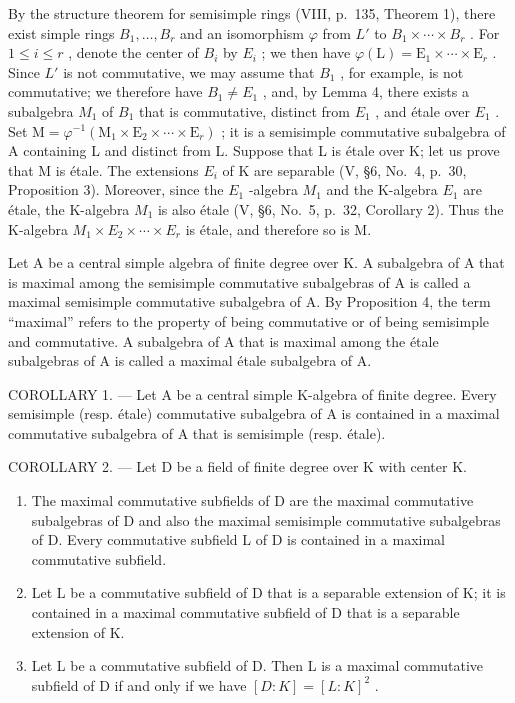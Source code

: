 By the structure theorem for semisimple rings (VIII, p.~135, Theorem 1), there exist simple rings \(B_{1},\ldots,B_{r}\) and an isomorphism \(\varphi\) from \(L'\) to \(B_{1}\times\cdots\times B_{r}\) . For \(1\leqslant i\leqslant r\) , denote the center of \(B_{i}\) by \(E_{i}\) ; we then have \(\varphi(\mathrm{L})=\mathrm{E}_{1}\times\cdots\times\mathrm{E}_{r}\) . Since \(L'\) is not commutative, we may assume that \(B_{1}\) , for example, is not commutative; we therefore have \(B_{1}\neq E_{1}\) , and, by Lemma 4, there exists a subalgebra \(M_{1}\) of \(B_{1}\) that is commutative, distinct from \(E_{1}\) , and étale over \(E_{1}\) . Set \(\mathrm{M} = \varphi^{-1}(\mathrm{M}_{1} \times \mathrm{E}_{2} \times \cdots \times \mathrm{E}_{r})\) ; it is a semisimple commutative subalgebra of A containing L and distinct from L. Suppose that L is étale over K; let us prove that M is étale. The extensions \(E_{i}\) of K are separable (V, §6, No.~4, p.~30, Proposition 3). Moreover, since the \(E_{1}\) -algebra \(M_{1}\) and the K-algebra \(E_{1}\) are étale, the K-algebra \(M_{1}\) is also étale (V, §6, No.~5, p.~32, Corollary 2). Thus the K-algebra \(M_{1} \times E_{2} \times \cdots \times E_{r}\) is étale, and therefore so is M.

Let A be a central simple algebra of finite degree over K. A subalgebra of A that is maximal among the semisimple commutative subalgebras of A is called a maximal semisimple commutative subalgebra of A. By Proposition 4, the term ``maximal'' refers to the property of being commutative or of being semisimple and commutative. A subalgebra of A that is maximal among the étale subalgebras of A is called a maximal étale subalgebra of A.

COROLLARY 1. --- Let A be a central simple K-algebra of finite degree. Every semisimple (resp. étale) commutative subalgebra of A is contained in a maximal commutative subalgebra of A that is semisimple (resp. étale).

COROLLARY 2. --- Let D be a field of finite degree over K with center K.

\begin{enumerate}
\def\labelenumi{\alph{enumi})}
\item
  The maximal commutative subfields of D are the maximal commutative subalgebras of D and also the maximal semisimple commutative subalgebras of D. Every commutative subfield L of D is contained in a maximal commutative subfield.
\item
  Let L be a commutative subfield of D that is a separable extension of K; it is contained in a maximal commutative subfield of D that is a separable extension of K.
\item
  Let L be a commutative subfield of D. Then L is a maximal commutative subfield of D if and only if we have \([D:K]=[L:K]^{2}\) .
\end{enumerate}

